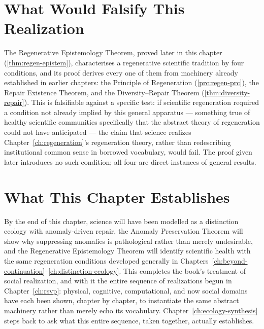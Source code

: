\documentclass[12pt,twoside,openright]{book}
\begin{document}
\section{What Would Falsify This Realization}
\label{sec:ch29-falsifiability}

The Regenerative Epistemology Theorem, proved later in this
chapter (\cref{thm:regen-epistem}), characterises a
regenerative scientific tradition by four conditions, and its
proof derives every one of them from machinery already
established in earlier chapters: the Principle of
Regeneration (\cref{prc:regen-prc}), the Repair Existence
Theorem, and the Diversity--Repair Theorem
(\cref{thm:diversity-repair}). This is falsifiable against a
specific test: if scientific regeneration required a
condition not already implied by this general apparatus ---
something true of healthy scientific communities specifically
that the abstract theory of regeneration could not have
anticipated --- the claim that science realizes
Chapter~\ref{ch:regeneration}'s regeneration theory, rather
than redescribing institutional common sense in borrowed
vocabulary, would fail. The proof given later introduces no
such condition; all four are direct instances of general
results.

\section{What This Chapter Establishes}
\label{sec:ch29-preview}

By the end of this chapter, science will have been modelled
as a distinction ecology with anomaly-driven repair, the
Anomaly Preservation Theorem will show why suppressing
anomalies is pathological rather than merely undesirable, and
the Regenerative Epistemology Theorem will identify scientific
health with the same regeneration conditions developed
generally in Chapters~\ref{ch:beyond-continuation}--\ref{ch:distinction-ecology}.
This completes the book's treatment of social realization, and
with it the entire sequence of realizations begun in
Chapter~\ref{ch:rsvp}: physical, cognitive, computational, and
now social domains have each been shown, chapter by chapter,
to instantiate the same abstract machinery rather than merely
echo its vocabulary. Chapter~\ref{ch:ecology-synthesis} steps
back to ask what this entire sequence, taken together,
actually establishes.
\end{document}
